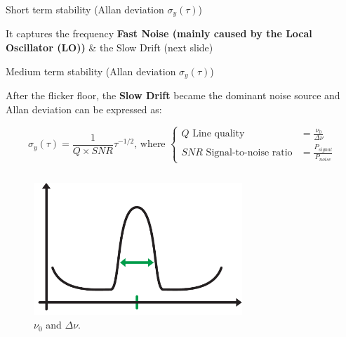 \begin{frame}{Short term stability (Allan deviation $\sigma_y(\tau)$)}

    It captures the frequency \textbf{Fast Noise (mainly caused by the Local Oscillator (LO))} \& the Slow Drift (next slide)


\end{frame}



\begin{frame}{Medium term stability (Allan deviation $\sigma_y(\tau)$)}

    After the flicker floor, the \textbf{Slow Drift} became the dominant noise source and Allan deviation can be expressed as:

    \begin{equation}
        \sigma_y(\tau) = \frac{1}{Q\times SNR} \tau^{-1/2} \text{, where }
        \begin{cases}
            Q   \text{ Line quality}          & = \frac{\nu_0}{\Delta \nu}     \\
            SNR \text{ Signal-to-noise ratio} & = \frac{P_{signal}}{P_{noise}}
        \end{cases}
    \end{equation}

    \begin{columns}[c, onlytextwidth]

        \begin{column}{0.5\textwidth}

            \begin{figure}
                \centering
                \includegraphics[width=0.7\textwidth]{pdf/Q-factor.pdf}
                \caption{$\nu_0$ and $\Delta \nu$.}
            \end{figure}


\end{column}
\end{columns}
\end{frame}
